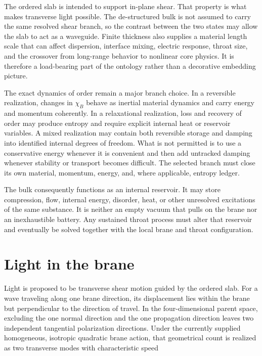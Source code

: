 The ordered slab is intended to support in-plane shear. That property is what
makes transverse light possible. The de-structured bulk is not assumed to carry
the same resolved shear branch, so the contrast between the two states may allow
the slab to act as a waveguide. Finite thickness also supplies a material length
scale that can affect dispersion, interface mixing, electric response, throat
size, and the crossover from long-range behavior to nonlinear core physics.
It is therefore a load-bearing part of the ontology rather than a decorative
embedding picture.

The exact dynamics of order remain a major branch choice. In a reversible
realization, changes in \(\chi_B\) behave as inertial material dynamics and carry
energy and momentum coherently. In a relaxational realization, loss and recovery
of order may produce entropy and require explicit internal heat or reservoir
variables. A mixed realization may contain both reversible storage and damping
into identified internal degrees of freedom. What is not permitted is to use a
conservative energy whenever it is convenient and then add untracked damping
whenever stability or transport becomes difficult. The selected branch must
close its own material, momentum, energy, and, where applicable, entropy ledger.

The bulk consequently functions as an internal reservoir. It may store
compression, flow, internal energy, disorder, heat, or other unresolved
excitations of the same substance. It is neither an empty vacuum that pulls on
the brane nor an inexhaustible battery. Any sustained throat process must alter
that reservoir and eventually be solved together with the local brane and
throat configuration.

\section{Light in the brane}

Light is proposed to be transverse shear motion guided by the ordered slab. For
a wave traveling along one brane direction, its displacement lies within the
brane but perpendicular to the direction of travel. In the four-dimensional
parent space, excluding the one normal direction and the one propagation
direction leaves two independent tangential polarization directions. Under the
currently supplied homogeneous, isotropic quadratic brane action, that
geometrical count is realized as two transverse modes with characteristic speed

